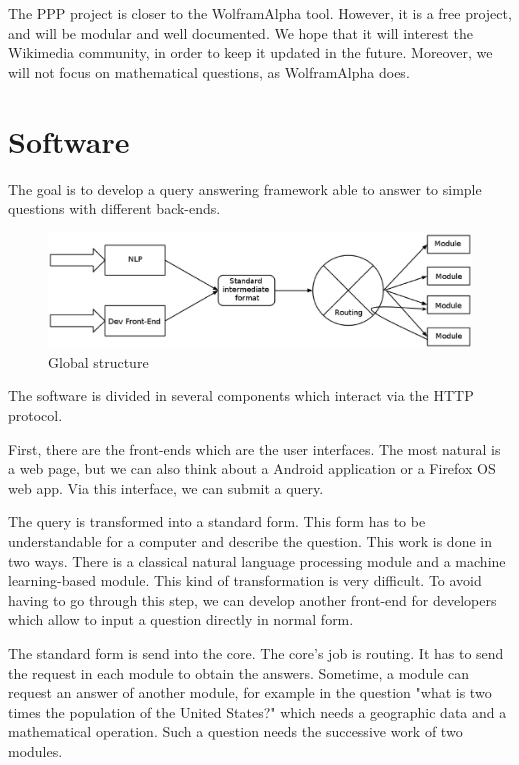 \documentclass[a4paper,10pt]{article}
\begin{document}
The PPP project is closer to the WolframAlpha tool. However, it is a free project,
and will be modular and well documented. We hope that it will interest the 
Wikimedia community, in order to keep it updated in the future. Moreover,
we will not focus on mathematical questions, as WolframAlpha does.

\section{Software}

The goal is to develop a query answering framework able to answer to simple questions with different back-ends. 

\begin{figure}[!h]
    \centering
    \includegraphics[scale=0.39]{images/Structure-PPP-en.eps}
    \caption{Global structure}
\end{figure}

The software is divided in several components which interact via the HTTP protocol.

First, there are the front-ends which are the user interfaces. The most natural is a web page, but we can also think about a Android application or a Firefox OS web app. Via this interface, we can submit a query.

The query is transformed into a standard form. This form has to be understandable for a computer and describe the question. This work is done in two ways. There is a classical natural language processing module and a machine learning-based module. This kind of transformation is very difficult. To avoid having to go through this step, we can develop another front-end for developers which allow to input a question directly in normal form.

The standard form is send into the core. The core's job is routing. It has to send the request in each module to obtain the answers. Sometime, a module can request an answer of another module, for example in the question "what is two times the population of the United States?" which needs a geographic data and a mathematical operation. Such a question needs the successive work of two modules.
\end{document}
